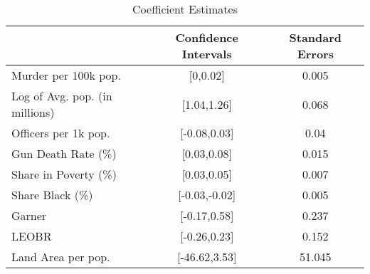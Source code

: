 \begin{table}[ht]
\centering
\caption{Coefficient Estimates} \label{table:bootstrap_coefficients}
\begin{tabular}{lcc}
\hline \hline
& Confidence Intervals & Standard Errors \\ 
\hline
Murder per 100k pop. &[0,0.02]&0.005\\
Log of Avg. pop. (in millions) &[1.04,1.26]&0.068\\
Officers per 1k pop. &[-0.08,0.03]&0.04\\
Gun Death Rate (\%) &[0.03,0.08]&0.015\\
Share in Poverty (\%) &[0.03,0.05]&0.007\\
Share Black (\%) &[-0.03,-0.02]&0.005\\
Garner &[-0.17,0.58]&0.237\\
LEOBR &[-0.26,0.23]&0.152\\
Land Area per pop. &[-46.62,3.53]&51.045\\
\hline \end{tabular} \end{table}